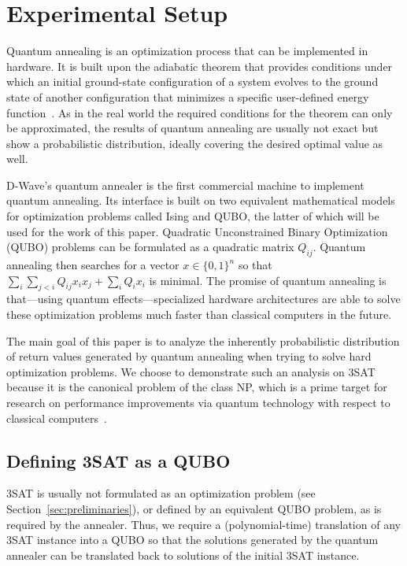 \section{Experimental Setup}
\label{sec:exp-setup}

Quantum annealing is an optimization process that can be implemented in hardware. It is built upon the adiabatic theorem that provides conditions under which an initial ground-state configuration of a system evolves to the ground state of another configuration that minimizes a specific user-defined energy function~\cite{mcgeoch2014adiabatic}. As in the real world the required conditions for the theorem can only be approximated, the results of quantum annealing are usually not exact but show a probabilistic distribution, ideally covering the desired optimal value as well.

D-Wave's quantum annealer is the first commercial machine to implement quantum annealing. Its interface is built on two equivalent mathematical models for optimization problems called Ising and QUBO, the latter of which will be used for the work of this paper. Quadratic Unconstrained Binary Optimization (QUBO) problems can be formulated as a quadratic matrix $Q_{ij}$. Quantum annealing then searches for a vector $x \in \{0,1\}^n$ so that $\sum_i \sum_{j < i} Q_{ij} x_i x_j + \sum_i Q_i x_i$ is minimal. The promise of quantum annealing is that---using quantum effects---specialized hardware architectures are able to solve these optimization problems much faster than classical computers in the future.

The main goal of this paper is to analyze the inherently probabilistic distribution of return values generated by quantum annealing when trying to solve hard optimization problems. We choose to demonstrate such an analysis on 3SAT because it is the canonical problem of the class NP, which is a prime target for research on performance improvements via quantum technology with respect to classical computers~\cite{mcgeoch2013experimental,lucas2014ising}.

\subsection{Defining 3SAT as a QUBO}
3SAT is usually not formulated as an optimization problem (see Section~\ref{sec:preliminaries}), or defined by an equivalent QUBO problem,
as is required by the annealer. Thus, we require a (polynomial-time) translation of any 3SAT instance into a QUBO so that the solutions generated by the quantum annealer can be translated back to solutions of the initial 3SAT instance.

